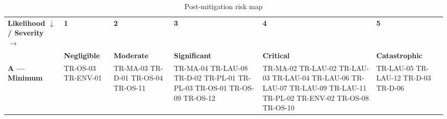 \begin{table}[H]
\centering
\caption{Post-mitigation risk map}
\scriptsize
\renewcommand{\arraystretch}{1.4}
\setlength{\tabcolsep}{3pt}

\begin{tabular}{>{\raggedright\arraybackslash}p{3.6cm}|
>{\centering\arraybackslash}p{2.1cm}|
>{\centering\arraybackslash}p{2.1cm}|
>{\centering\arraybackslash}p{2.1cm}|
>{\centering\arraybackslash}p{2.1cm}|
>{\centering\arraybackslash}p{2.4cm}}
\rowcolor{gray!20}
\textbf{Likelihood $\downarrow$ / Severity $\rightarrow$} 
& \textbf{1} & \textbf{2} & \textbf{3} & \textbf{4} & \textbf{5} \\

\rowcolor{gray!10}
& \textbf{Negligible} 
& \textbf{Moderate} 
& \textbf{Significant} 
& \textbf{Critical} 
& \textbf{Catastrophic} \\

\textbf{A — Minimum}
& \cellcolor{green!20} TR-OS-03 \newline TR-ENV-01
& \cellcolor{green!20} TR-MA-03 \newline TR-D-01 \newline TR-OS-04 \newline TR-OS-11
& \cellcolor{green!20} TR-MA-04 \newline TR-LAU-08 \newline TR-D-02 \newline TR-PL-01 \newline TR-PL-03 \newline TR-OS-01 \newline TR-OS-09 \newline TR-OS-12
& \cellcolor{yellow!30} TR-MA-02 \newline TR-LAU-02 \newline TR-LAU-03 \newline TR-LAU-04 \newline TR-LAU-06 \newline TR-LAU-07 \newline TR-LAU-09 \newline TR-LAU-11 \newline TR-PL-02 \newline TR-ENV-02 \newline TR-OS-08 \newline TR-OS-10
& \cellcolor{yellow!30} TR-LAU-05 \newline TR-LAU-12 \newline TR-D-03 \newline TR-D-06 \\


\end{tabular}
\end{table}
